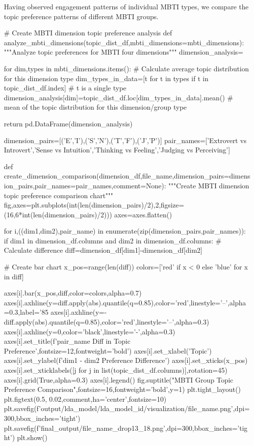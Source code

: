 \documentclass[12pt]{article}
\begin{document}
	Having observed engagement patterns of individual MBTI types, we compare the topic preference patterns of different MBTI groups.
	\begin{python}
# Create MBTI dimension topic preference analysis
def analyze_mbti_dimensions(topic_dist_df,mbti_dimensions=mbti_dimensions):
    """Analyze topic preferences for MBTI four dimensions"""
    dimension_analysis={}
    
    for dim,types in mbti_dimensions.items():
        # Calculate average topic distribution for this dimension type
        dim_types_in_data=[t for t in types if t in topic_dist_df.index] # t is a single type
        dimension_analysis[dim]=topic_dist_df.loc[dim_types_in_data].mean() # mean of the topic distribution for this dimension/group type
    
    return pd.DataFrame(dimension_analysis)

dimension_pairs=[('E','I'),('S','N'),('T','F'),('J','P')]
pair_names=['Extrovert vs Introvert','Sense vs Intuition','Thinking vs Feeling','Judging vs Perceiving']
    

def create_dimension_comparison(dimension_df,file_name,dimension_pairs=dimension_pairs,pair_names=pair_names,comment=None):
    """Create MBTI dimension topic preference comparison chart"""
    fig,axes=plt.subplots(int(len(dimension_pairs)/2),2,figsize=(16,6*int(len(dimension_pairs)/2)))
    axes=axes.flatten()
        
    for i,((dim1,dim2),pair_name) in enumerate(zip(dimension_pairs,pair_names)):
        if dim1 in dimension_df.columns and dim2 in dimension_df.columns:
            # Calculate difference
            diff=dimension_df[dim1]-dimension_df[dim2]
            
            # Create bar chart
            x_pos=range(len(diff))
            colors=['red' if x < 0 else 'blue' for x in diff]
            
            axes[i].bar(x_pos,diff,color=colors,alpha=0.7)
            axes[i].axhline(y=diff.apply(abs).quantile(q=0.85),color='red',linestyle='--',alpha=0.3,label='85%
            axes[i].axhline(y=-diff.apply(abs).quantile(q=0.85),color='red',linestyle='--',alpha=0.3)
            axes[i].axhline(y=0,color='black',linestyle='-',alpha=0.3)
            axes[i].set_title(f'{pair_name} Diff in Topic Preference',fontsize=12,fontweight='bold')
            axes[i].set_xlabel('Topic')
            axes[i].set_ylabel(f'{dim1} - {dim2} Preference Difference')
            axes[i].set_xticks(x_pos)
            axes[i].set_xticklabels([j for j in list(topic_dist_df.columns)],rotation=45)
            axes[i].grid(True,alpha=0.3)
            axes[i].legend()
    fig.suptitle("MBTI Group Topic Preference Comparison",fontsize=16,fontweight='bold',y=1)
    plt.tight_layout()
    plt.figtext(0.5, 0.02,comment,ha='center',fontsize=10)
    plt.savefig(f'output/lda_model/lda_{model_id}/visualization/{file_name}.png',dpi=300,bbox_inches='tight')
    plt.savefig(f'final_output/{file_name}_drop13_18.png',dpi=300,bbox_inches='tight')
    plt.show()



\end{python}
\end{document}
